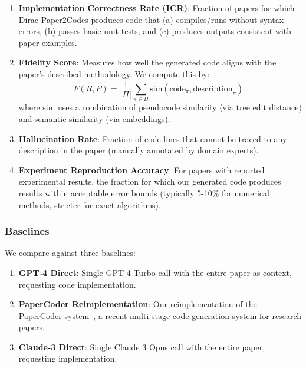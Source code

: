 \documentclass{ieeeaccess}
\begin{document}
\begin{enumerate}
    \item \textbf{Implementation Correctness Rate (ICR)}: Fraction of papers for which Dirac-Paper2Codes produces code that (a) compiles/runs without syntax errors, (b) passes basic unit tests, and (c) produces outputs consistent with paper examples.
    
    \item \textbf{Fidelity Score}: Measures how well the generated code aligns with the paper's described methodology. We compute this by:
    \begin{equation}
    F(R, P) = \frac{1}{|\Pi|} \sum_{\pi \in \Pi} \text{sim}(\text{code}_{\pi}, \text{description}_{\pi}),
    \label{eq:fidelity}
    \end{equation}
    where $\text{sim}$ uses a combination of pseudocode similarity (via tree edit distance) and semantic similarity (via embeddings).
    
    \item \textbf{Hallucination Rate}: Fraction of code lines that cannot be traced to any description in the paper (manually annotated by domain experts).
    
    \item \textbf{Experiment Reproduction Accuracy}: For papers with reported experimental results, the fraction for which our generated code produces results within acceptable error bounds (typically 5-10\% for numerical methods, stricter for exact algorithms).
\end{enumerate}

\subsubsection{Baselines}
We compare against three baselines:

\begin{enumerate}
    \item \textbf{GPT-4 Direct}: Single GPT-4 Turbo call with the entire paper as context, requesting code implementation.
    \item \textbf{PaperCoder Reimplementation}: Our reimplementation of the PaperCoder system~\cite{seo2024papercoder}, a recent multi-stage code generation system for research papers.
    \item \textbf{Claude-3 Direct}: Single Claude 3 Opus call with the entire paper, requesting implementation.
\end{enumerate}
\end{document}
